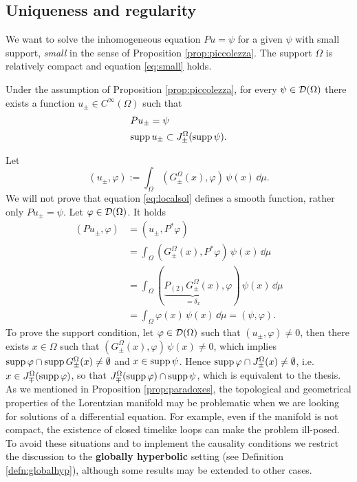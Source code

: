 \subsection{Uniqueness and regularity}
We want to solve the inhomogeneous equation $Pu = \psi$ for a given $\psi$ with small support, \emph{small} in the sense of Proposition \ref{prop:piccolezza}. The support $\Omega$ is relatively compact and equation \eqref{eq:small} holds.
\begin{prop}
	Under the assumption of Proposition \ref{prop:piccolezza}, for every $\psi\in\mathcal{D}(\Omega)$ there exists a function $u_\pm\in C^\infty(\Omega)$ such that
	\[	\begin{aligned}
		&Pu_\pm=\psi\\
		&\text{supp}\,u_\pm\subset J_\pm^\Omega(\text{supp}\,\psi).
	\end{aligned}		\]
	\label{prop:localsol}
\end{prop}
\Proof Let \begin{equation}
	(u_\pm,\varphi):=\int_{\Omega}(G_\pm^\Omega(x),\varphi)\,\psi(x)\,\dd \mu.
	\label{eq:localsol}
\end{equation}
We will not prove that equation \eqref{eq:localsol} defines a smooth function, rather only $Pu_\pm=\psi$. Let $\varphi\in\mathcal{D}(\Omega)$. It holds
\[\begin{aligned}
(Pu_\pm,\varphi)&=(u_\pm,P^*\varphi)\\
&=\int_{\Omega}(G_\pm^\Omega(x),P^*\varphi)\,\psi(x)\,\dd \mu\\
&=\int_{\Omega}(\underbrace{P_{(2)}G_\pm^\Omega(x)}_{=\delta_x},\varphi)\,\psi(x)\,\dd \mu\\
&=\int_{\Omega}\varphi(x)\,\psi(x)\,\dd\mu=(\psi,\varphi).
\end{aligned}				\]
To prove the support condition, let $\varphi\in\mathcal{D}(\Omega)$ such that $(u_\pm,\varphi)\neq 0$, then there exists $x\in\Omega$ such that $(G_\pm^\Omega(x),\varphi)\,\psi(x)\neq 0$, which implies $\text{supp}\,\varphi\cap\text{supp}\,G_\pm^\Omega(x)\neq \emptyset$ and $x\in\text{supp}\,\psi$. Hence $\text{supp}\,\varphi\cap J_\pm^\Omega(x)\neq\emptyset$, i.e. $x\in J_\mp^\Omega(\text{supp}\,\varphi)$, so that $J_\mp^\Omega(\text{supp}\,\varphi)\cap\text{supp}\,\psi$, which is equivalent to the thesis.\endproof\\

\noindent As we mentioned in Proposition \ref{prop:paradoxes}, the topological and geometrical properties of the Lorentzian manifold may be problematic when we are looking for solutions of a differential equation. For example, even if the manifold is not compact, the existence of closed timelike loops can make the problem ill-posed.\\
To avoid these situations and to implement the causality conditions we restrict the discussion to the \textbf{globally hyperbolic} setting (see Definition \ref{defn:globalhyp}), although some results may be extended to other cases.\\

